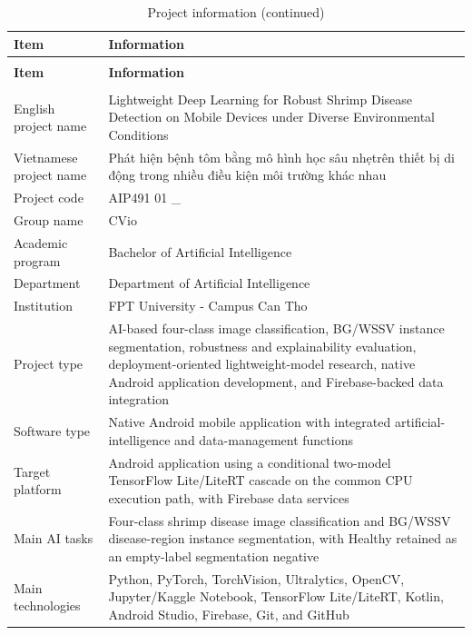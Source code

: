\documentclass[12pt,a4paper]{report}
\begin{document}
\begin{longtable}{|>{\centering\arraybackslash}p{4.10cm}|>{\centering\arraybackslash}p{11.70cm}|}
\caption{Project information}\\
\hline
\rowcolor{HeaderPeach}\textbf{Item} & \textbf{Information} \\ \hline
\endfirsthead
\caption[]{Project information (continued)}\\
\hline
\rowcolor{HeaderPeach}\textbf{Item} & \textbf{Information} \\ \hline
\endhead
\hline
\multicolumn{2}{r}{\footnotesize Continued on next page}\\
\endfoot
\hline
\endlastfoot
\rowcolor{RevisionYellow}English project name & Lightweight Deep Learning for Robust Shrimp Disease Detection on Mobile Devices under Diverse Environmental Conditions \\ \hline
\rowcolor{RevisionYellow}Vietnamese project name & Phát hiện bệnh tôm bằng mô hình học sâu nhẹtrên thiết bị di động trong nhiều điều kiện môi trường khác nhau \\ \hline
\rowcolor{RevisionYellow}Project code & AIP491 01 \_ \\ \hline
\rowcolor{RevisionYellow}Group name & CVio \\ \hline
\rowcolor{RevisionYellow}Academic program & Bachelor of Artificial Intelligence \\ \hline
\rowcolor{RevisionYellow}Department & Department of Artificial Intelligence \\ \hline
\rowcolor{RevisionYellow}Institution & FPT University - Campus Can Tho \\ \hline
\rowcolor{RevisionYellow}Project type & AI-based four-class image classification, BG/WSSV instance segmentation, robustness and explainability evaluation, deployment-oriented lightweight-model research, native Android application development, and Firebase-backed data integration \\ \hline
\rowcolor{RevisionYellow}Software type & Native Android mobile application with integrated artificial-intelligence and data-management functions \\ \hline
\rowcolor{RevisionYellow}Target platform & Android application using a conditional two-model TensorFlow Lite/LiteRT cascade on the common CPU execution path, with Firebase data services \\ \hline
\rowcolor{RevisionYellow}Main AI tasks & Four-class shrimp disease image classification and BG/WSSV disease-region instance segmentation, with Healthy retained as an empty-label segmentation negative \\ \hline
\rowcolor{RevisionYellow}Main technologies & Python, PyTorch, TorchVision, Ultralytics, OpenCV, Jupyter/Kaggle Notebook, TensorFlow Lite/LiteRT, Kotlin, Android Studio, Firebase, Git, and GitHub \\ \hline
\end{longtable}
\end{document}
